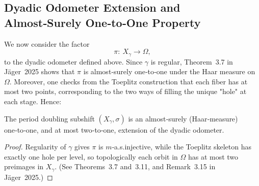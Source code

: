 \subsection{Dyadic Odometer Extension and Almost‑Surely One‑to‑One Property}
We now consider the factor
\[
\pi:\ X_\gamma\to\Omega,
\]
to the dyadic odometer defined above.  Since $\gamma$ is regular, Theorem 3.7 in Jäger 2025 shows that $\pi$ is almost‑surely one‑to‑one under the Haar measure on $\Omega$.  Moreover, one checks from the Toeplitz construction that each fiber has at most two points, corresponding to the two ways of filling the unique "hole" at each stage.  Hence:
\begin{proposition}
The period doubling subshift $(X_\gamma,\sigma)$ is an almost‑surely (Haar‑measure) one‑to‑one, and at most two‑to‑one, extension of the dyadic odometer.
\end{proposition}
\begin{proof}
Regularity of $\gamma$ gives $\pi$ is $m$‑a.s.\;injective, while the Toeplitz skeleton has exactly one hole per level, so topologically each orbit in $\Omega$ has at most two preimages in $X_\gamma$.  (See Theorems 3.7 and 3.11, and Remark 3.15 in Jäger 2025.)
\end{proof}
